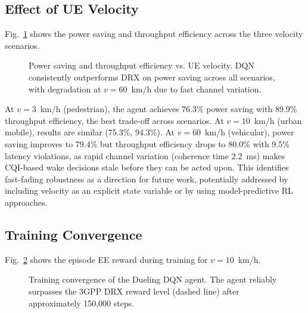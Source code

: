 \documentclass[conference]{IEEEtran}
\begin{document}
\subsection{Effect of UE Velocity}

Fig.~\ref{fig:velocity} shows the power saving and throughput efficiency
across the three velocity scenarios.

\begin{figure}[t]
  \centering
  \caption{Power saving and throughput efficiency vs. UE velocity.
           DQN consistently outperforms DRX on power saving across all
           scenarios, with degradation at $v = 60$~km/h due to
           fast channel variation.}
  \label{fig:velocity}
\end{figure}

At $v = 3$~km/h (pedestrian), the agent achieves 76.3\% power saving
with 89.9\% throughput efficiency, the best trade-off across scenarios.
At $v = 10$~km/h (urban mobile), results are similar (75.3\%, 94.3\%).
At $v = 60$~km/h (vehicular), power saving improves to 79.4\% but
throughput efficiency drops to 80.0\% with 9.5\% latency violations,
as rapid channel variation (coherence time 2.2~ms) makes CQI-based
wake decisions stale before they can be acted upon.
This identifies fast-fading robustness as a direction for future work,
potentially addressed by including velocity as an explicit state variable
or by using model-predictive RL approaches.

\subsection{Training Convergence}

Fig.~\ref{fig:convergence} shows the episode EE reward during training
for $v = 10$~km/h.

\begin{figure}[t]
  \centering
  \caption{Training convergence of the Dueling DQN agent.
           The agent reliably surpasses the 3GPP DRX reward level
           (dashed line) after approximately 150,000 steps.}
  \label{fig:convergence}
\end{figure}
\end{document}
